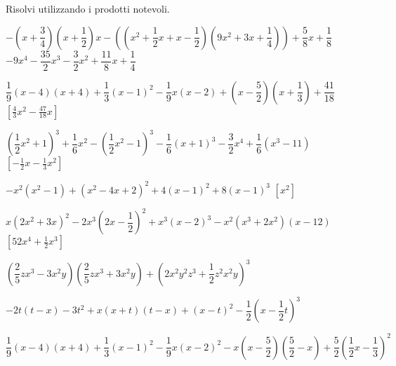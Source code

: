 \begin{esercizio}[\Ast]
 \label{ese:11.37}
Risolvi utilizzando i prodotti notevoli.
 \begin{enumeratea}
 \item 
\(-\left(x+\dfrac{3}{4}\right)\left(x+\dfrac{1}{2}\right)x-
  \left(\left(x^2+\dfrac{1}{2}x+x-\dfrac{1}{2}\right)
  \left(9x^2+3x+\dfrac{1}{4}\right)\right)+
  \dfrac{5}{8}x + \dfrac{1}{8}\)
  \hfill \(- 9 x^{4} - \dfrac{35}{2} x^{3} - \dfrac{3}{2} x^{2} + 
           \dfrac{11}{8} x + \dfrac{1}{4}\)
 \item 
$\dfrac{1}{9}(x-4)(x+4)+\dfrac{1}{3}(x-1)^{2}-\dfrac{1}{9}x(x-2)+\left(x-\dfrac{
5}{2}\right)\left(x+\dfrac{1}{3}\right)+\dfrac{41}{18}$
  \hfill $\left[\frac{4}{3}x^{2}-\frac{47}{18}x\right]$
 \item 
$\left(\dfrac{1}{2}x^{2}+1\right)^{3}+\dfrac{1}{6}x^{2}-\left(\dfrac{1}{2}x^{2}
-1\right)^{3}-\dfrac{1}{6}(x+1)^{3}-\dfrac{3}{2}x^{4}+\dfrac{1}{6}
\left(x^3-11\right)$
  \hfill $\left[-{\frac{1}{2}}x-\frac{1}{3}x^{2}\right]$
 \item 
$-x^{2}\left(x^{2}-1\right)+\left(x^{2}-4x+2\right)^{2}+4(x-1)^{2}+8(x-1)^{3}$
  \hfill $\left[x^2\right]$
 \item 
$x\left(2x^{2}+3x\right)^{2}-2x^{3}\left(2x-\dfrac{1}{2}\right)^{2}+x^{3}(x-2)^{
3}-x^{2}\left(x^{3}+2x^{2}\right)(x-12)$
  \hfill $\left[52x^4+\frac{1}{2}x^3\right]$
 \item 
$\left(\dfrac{2}{5}zx^{3}-3x^{2}y\right)\left(\dfrac{2}{5}zx^{3}+3x^{2}
y\right)+\left(2x^{2}y^{2}z^{3}+\dfrac{1}{2}z^{2}x^{2}y\right)^{3}$
 \item 
$-2t(t-x)-3t^{2}+x(x+t)(t-x)+(x-t)^{2}-\dfrac{1}{2}\left(x-\dfrac{1}{2}t\right)^
{3}$
 \item 
$\dfrac{1}{9}(x-4)(x+4)+\dfrac{1}{3}(x-1)^{2}-\dfrac{1}{9}x(x-2)^{2}
-x\left(x-\dfrac{5}{2}\right)\left(\dfrac{5}{2}-x\right)+\dfrac{5}{2}
\left(\dfrac{1}{2}x-\dfrac{1}{3}\right)^{2}$
 \end{enumeratea}
\end{esercizio}

